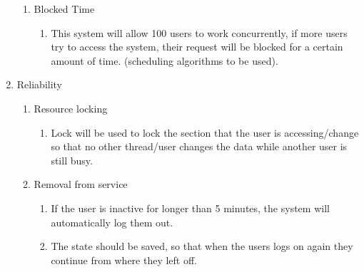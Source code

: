 \documentclass[hidelinks,a4paper,12pt]{article}
\begin{document}
\begin{enumerate}
\begin{enumerate}
		\item  Blocked Time
		\begin{enumerate}
			\item   This system will allow 100 users to work concurrently, if more users try to access the system, their request will be blocked for a certain amount of time.             (scheduling algorithms to be used).
		\end{enumerate}
	\end{enumerate}
	
	
	
	\item  Reliability
		\begin{enumerate}
			\item  Resource locking
				\begin{enumerate}
					\item  Lock will be used to lock the section that the user is accessing/change so that no other thread/user changes the data while another user is still busy.
				\end{enumerate}
			
			\item Removal from service
							\begin{enumerate}
								\item   If the user is inactive for longer than 5 minutes, the system will automatically log them out.
								\item The state should be saved, so that when the users logs on again they continue from where they left off.
							\end{enumerate}
		
		\end{enumerate}
\end{enumerate}
\end{document}
